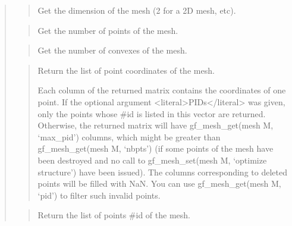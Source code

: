 \documentclass[a4paper,11pt,english]{sphinxmanual}
\begin{document}
\sphinxAtStartPar
{}
\begin{quote}

\sphinxAtStartPar
{}
\begin{quote}

\sphinxAtStartPar
Get the dimension of the mesh (2 for a 2D mesh, etc).
\end{quote}

\sphinxAtStartPar
{}
\begin{quote}

\sphinxAtStartPar
Get the number of points of the mesh.
\end{quote}

\sphinxAtStartPar
{}
\begin{quote}

\sphinxAtStartPar
Get the number of convexes of the mesh.
\end{quote}

\sphinxAtStartPar
{}
\begin{quote}

\sphinxAtStartPar
Return the list of point coordinates of the mesh.

\sphinxAtStartPar
Each column of the returned matrix contains the coordinates of one
point. If the optional argument \textless{}literal\textgreater{}PIDs\textless{}/literal\textgreater{} was given, only the points
whose \#id is listed in this vector are returned. Otherwise, the
returned matrix will have gf\_mesh\_get(mesh M, ‘max\_pid’) columns, which might
be greater than gf\_mesh\_get(mesh M, ‘nbpts’) (if some points of the mesh have
been destroyed and no call to gf\_mesh\_set(mesh M, ‘optimize structure’) have
been issued). The columns corresponding to deleted points will be
filled with NaN. You can use gf\_mesh\_get(mesh M, ‘pid’) to filter such invalid
points.
\end{quote}

\sphinxAtStartPar
{}
\begin{quote}

\sphinxAtStartPar
Return the list of points \#id of the mesh.


\end{quote}
\end{quote}
\end{document}
